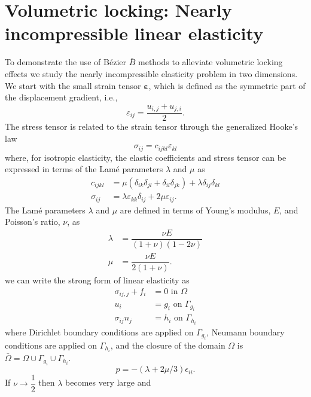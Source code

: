 \documentclass{article}
\newcommand{\Bezier}{{B\'{e}zier} }
\begin{document}
\section{Volumetric locking: Nearly incompressible linear elasticity}
\label{sec:nearlyincompressible}
To demonstrate the use of \Bezier $\bar{B}$ {methods} to alleviate volumetric locking effects we study the nearly incompressible elasticity problem in two dimensions. We start with the small strain tensor $\boldsymbol{\varepsilon}$, which is defined as the symmetric part of the displacement gradient, i.e., 
\begin{equation}
\varepsilon_{ij}=\dfrac{u_{i,j}+u_{j,i}}{2}.
\end{equation}
The stress tensor is related to the strain tensor through the generalized Hooke's law
\begin{equation}
\sigma_{ij}=c_{ijkl}\varepsilon_{kl}
\end{equation}
where, for isotropic elasticity, the elastic coefficients and stress tensor can be expressed in terms of the Lam\'{e} parameters $\lambda$ and $\mu$ as
\begin{align}
c_{ijkl} &=\mu(\delta_{ik}\delta_{jl}+\delta_{il}\delta_{jk})+\lambda\delta_{ij}\delta_{kl}\\
\sigma_{ij} &= \lambda\varepsilon_{kk}\delta_{ij} + 2\mu\varepsilon_{ij}.
\end{align}
The Lam\'e parameters $\lambda$ and $\mu$ are defined in terms of Young's modulus, $E$, and Poisson's ratio, $\nu$, as
\begin{align}
\lambda &=\dfrac{\nu{E}}{(1+\nu)(1-2\nu)}\\
\mu &=\dfrac{\nu{E}}{2(1+\nu)}.
\end{align}
we can write the strong form of linear elasticity as
\begin{align}
	\sigma_{ij,j}+f_i &= 0 \text{ in $\Omega$} \\
    u_i &= g_i\text{ on $\Gamma_{g_i}$} \\
    \sigma_{ij}n_j &= h_i\text{ on $\Gamma_{h_i}$}
\end{align}
where Dirichlet boundary conditions are applied on $\Gamma_{g_i}$, Neumann boundary conditions are applied on $\Gamma_{h_i}$, and the closure of the domain $\Omega$ is $\bar{\Omega}=\Omega\cup\Gamma_{g_i}\cup\Gamma_{h_i}$. 
\begin{equation}
    p=-(\lambda+2\mu/3){\epsilon}_{ii}.
\end{equation}
If $\nu\rightarrow\dfrac{1}{2}$ then $\lambda$ becomes very large and 
\end{document}
